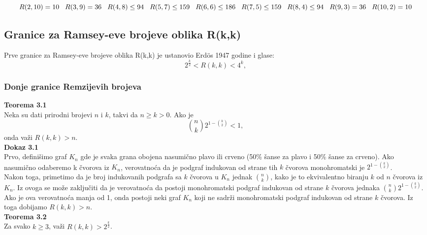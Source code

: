 \documentclass[12pt,a4paper]{article}
\begin{document}
\[R(2,10)=10\hspace{0.3cm}R(3,9)=36\hspace{0.3cm}R(4,8)\leq 94\hspace{0.3cm}R(5,7)\leq 159\hspace{0.3cm}R(6,6)\leq 186\hspace{0.3cm}R(7,5)\leq 159\hspace{0.3cm}R(8,4)\leq 94\hspace{0.3cm}R(9,3)=36\hspace{0.3cm}R(10,2)=10\]
\normalsize
\subsection{Granice za Ramsey-eve brojeve oblika R(k,k)}
Prve granice za Ramsey-eve brojeve oblika R(k,k) je ustanovio  Erd\"os 1947 godine i glase:
\[2^\frac{k}{2}<R(k,k)<4^k,\]

\subsubsection{Donje granice Remzijevih brojeva}
{\noindent\fontsize{12pt}{12pt}\textbf{Teorema 3.1}}
\vspace{0.5em} \\
Neka su dati prirodni brojevi $n$ i $k$, takvi da $n\geq k>0$. Ako je
\[\binom{n}{k}2^{1-\binom{k}{2}}<1,\]
onda važi $R(k,k)>n$.\\

{\noindent\fontsize{12pt}{12pt}\textbf{Dokaz 3.1}}
\vspace{0.5em} \\
Prvo, definišimo graf $K_n$ gde je svaka grana obojena nasumično plavo ili crveno (50\% šanse za plavo i 50\% šanse za crveno). Ako nasumično odaberemo k čvorova iz $K_n$, verovatnoća da je podgraf indukovan od strane tih $k$ čvorova monohromatski je $2^{1-\binom{k}{2}}$.\\
Nakon toga, primetimo da je broj indukovanih podgrafa sa $k$ čvorova u $K_n$ jednak $\binom{n}{k}$, kako je to ekvivalentno biranju $k$ od $n$ čvorova iz $K_n$. Iz ovoga se može zaključiti da je verovatnoća da postoji monohromatski podgraf indukovan od strane $k$ čvorova jednaka $\binom{n}{k}2^{1-\binom{k}{2}}$. Ako je ova verovatnoća manja od 1, onda postoji neki graf $K_n$ koji ne sadrži monohromatski podgraf indukovan od strane $k$ čvorova. Iz toga dobijamo $R(k,k)>n$. \\

{\noindent\fontsize{12pt}{12pt}\textbf{Teorema 3.2}}
\vspace{0.5em} \\
Za svako $k\geq 3$, važi $R(k,k)>2^{\frac{k}{2}}$. \\
\end{document}
